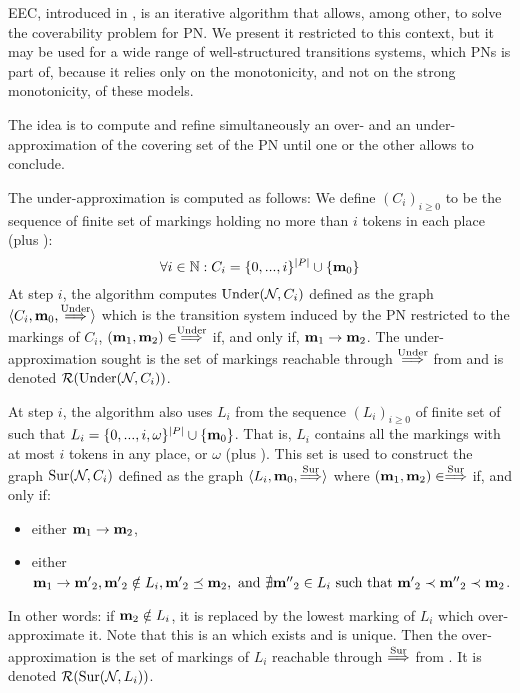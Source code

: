 \ac{EEC}, introduced in \cite{Geeraerts07thesis, Geeraerts06}, is an iterative algorithm that allows, among other, to solve the coverability problem for \ac{PN}.
We present it restricted to this context, but it may be used for a wide range of well-structured transitions systems, which \acp{PN} is part of, because it relies only on the monotonicity, and not on the strong monotonicity, of these models.

The idea is to compute and refine simultaneously an over- and an under-approximation of the covering set of the \ac{PN} until one or the other allows to conclude.

The under-approximation is computed as follows:
We define $(C_i)_{i \geq 0}$ to be the sequence of finite set of markings holding no more than $i$ tokens in each place (plus \mari):
\[
  \forall i \in \mathbb{N} : C_i = \{0, ..., i\}^{\left|P\right|} \cup \{\mathbf{m}_0\}
\]
At step $i$, the algorithm computes $\operatorname{Under}(\mathcal{N}_{}, C_i)$ defined as the graph $\langle C_i, \mathbf{m}_0, \stackrel{\operatorname{Under}}{\Longrightarrow} \rangle$ which is the transition system induced by the \ac{PN} \namePN restricted to the markings of $C_i$, \ie $(\mathbf{m}_1, \mathbf{m}_2) \in \stackrel{\operatorname{Under}}{\Longrightarrow}$ if, and only if, $\mathbf{m}_1 \rightarrow \mathbf{m}_2$.
The under-approximation sought is the set of markings reachable through $\stackrel{\operatorname{Under}}{\Longrightarrow}$ from \mari and is denoted $\operatorname{\mathcal{R}}(\operatorname{Under}(\mathcal{N}_{}, C_i))$.

At step $i$, the algorithm also uses $L_i$ from the sequence $(L_i)_{i \geq 0}$ of finite set of \omarks such that $L_i = \{0, ..., i, \omega \}^{\left|P\right|} \cup \{\mathbf{m}_0\}$.
That is, $L_i$ contains all the markings with at most $i$ tokens in any place, or $\omega$ (plus \mari).
This set is used to construct the graph $\operatorname{Sur}(\mathcal{N}_{}, C_i)$ defined as the graph $\langle L_i, \mathbf{m}_0, \stackrel{\operatorname{Sur}}{\Longrightarrow} \rangle$ where $(\mathbf{m}_1, \mathbf{m}_2) \in \stackrel{\operatorname{Sur}}{\Longrightarrow}$ if, and only if:
\begin{itemize}
  \item either $\mathbf{m}_1 \rightarrow \mathbf{m}_2$,
  \item either $\mathbf{m}_1 \rightarrow \mathbf{m'}_2, \mathbf{m'}_2 \notin L_i, \mathbf{m'}_2 \preceq \mathbf{m}_2, \text{ and } \nexists \mathbf{m''}_2 \in L_i \text{ such that } \mathbf{m'}_2 \prec \mathbf{m''}_2 \prec \mathbf{m}_2$.
\end{itemize}
In other words: if $\mathbf{m}_2 \notin L_i$, it is replaced by the lowest marking of $L_i$ which over-approximate it.
Note that this is an \omark which exists and is unique. 
Then the over-approximation is the set of markings of $L_i$ reachable through $\stackrel{\operatorname{Sur}}{\Longrightarrow}$ from \mari. It is denoted $\operatorname{\mathcal{R}}(\operatorname{Sur}(\mathcal{N}_{}, L_i))$.

